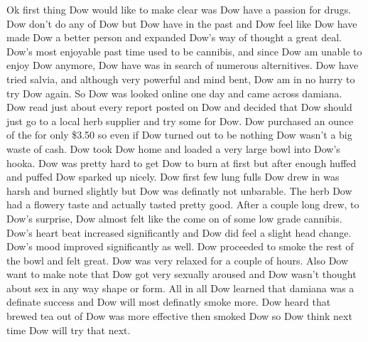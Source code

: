\documentclass[12pt]{book}
\begin{document}
Ok first thing Dow would like to make clear was Dow have a passion for drugs. Dow don't do any of Dow but Dow have in the past and Dow feel like Dow have made Dow a better person and expanded Dow's way of thought a great deal. Dow's most enjoyable past time used to be cannibis, and since Dow am unable to enjoy Dow anymore, Dow have was in search of numerous alternitives. Dow have tried salvia, and although very powerful and mind bent, Dow am in no hurry to try Dow again. So Dow was looked online one day and came across damiana. Dow read just about every report posted on Dow and decided that Dow should just go to a local herb supplier and try some for Dow. Dow purchased an ounce of the for only \$3.50 so even if Dow turned out to be nothing Dow wasn't a big waste of cash. Dow took Dow home and loaded a very large bowl into Dow's hooka. Dow was pretty hard to get Dow to burn at first but after enough huffed and puffed Dow sparked up nicely. Dow first few lung fulls Dow drew in was harsh and burned slightly but Dow was definatly not unbarable. The herb Dow had a flowery taste and actually tasted pretty good. After a couple long drew, to Dow's surprise, Dow almost felt like the come on of some low grade cannibis. Dow's heart beat increased significantly and Dow did feel a slight head change. Dow's mood improved significantly as well. Dow proceeded to smoke the rest of the bowl and felt great. Dow was very relaxed for a couple of hours. Also Dow want to make note that Dow got very sexually aroused and Dow wasn't thought about sex in any way shape or form. All in all Dow learned that damiana was a definate success and Dow will most definatly smoke more. Dow heard that brewed tea out of Dow was more effective then smoked Dow so Dow think next time Dow will try that next.
\end{document}

